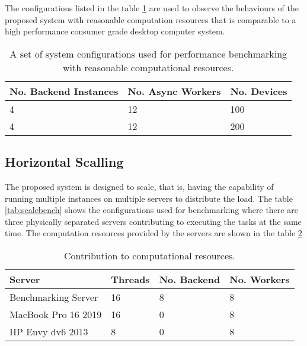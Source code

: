 \documentclass[../thesis.tex]{subfiles}
\begin{document}
The configurations listed in the table \ref{tab:highsysconfbench} are used to observe the behaviours of the proposed system with reasonable computation resources that is comparable to a high performance consumer grade desktop computer system.

\begin{table}[h!]
	\begin{center}
		\caption{A set of system configurations used for performance benchmarking with reasonable computational resources.}
		\label{tab:highsysconfbench}
		\begin{tabular}{l|l|l}
			\toprule
			\textbf{No. Backend Instances} & \textbf{No. Async Workers} & \textbf{No. Devices}\\
			\midrule
			4 & 12 & 100\\
			4 & 12 & 200\\
			\bottomrule
		\end{tabular}
	\end{center}
\end{table}

\subsection{Horizontal Scalling}

The proposed system is designed to scale, that is, having the capability of running multiple instances on multiple servers to distribute the load. The table \ref{tab:scalebench} shows the configurations used for benchmarking where there are three physically separated servers contributing to executing the tasks at the same time. The computation resources provided by the servers are shown in the table \ref{tab:computecontrib}

\begin{table}[h!]
	\begin{center}
		\caption{Contribution to computational resources.}
		\label{tab:computecontrib}
		\begin{tabular}{l|l|l|l}
			\toprule
			\textbf{Server} & \textbf{Threads} & \textbf{No. Backend} & \textbf{No. Workers}\\
			\midrule
			Benchmarking Server & 16 & 8 & 8\\
			MacBook Pro 16 2019 & 16 & 0 & 8\\
			HP Envy dv6 2013 & 8 & 0 & 8\\
			\bottomrule
		\end{tabular}
	\end{center}
\end{table}
\end{document}
